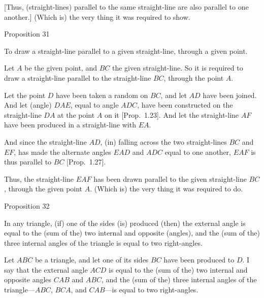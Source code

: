 \mbox{[}Thus, (straight-lines) parallel to the same straight-line are also parallel
to one another.] (Which is) the very thing it was required to show.


\begin{center}
{\large Proposition 31}
\end{center}

To draw a straight-line parallel to a given straight-line, through a given
point.

Let $A$ be the given point, and $BC$ the given straight-line. So it is
required to draw a straight-line parallel to the straight-line $BC$, through
the point $A$.

Let the point $D$ have been taken a random  on $BC$, and let $AD$ have been
joined. And let (angle) $DAE$, equal to angle $ADC$,  have been constructed 
on the straight-line $DA$ at the point $A$ on it [Prop.~1.23]. And let the
straight-line $AF$ have been
produced in a straight-line with $EA$.

\epsfysize=1.25in
\centerline{}

And since the straight-line $AD$, (in) falling across the two straight-lines
$BC$ and $EF$,  has made the alternate
angles $EAD$ and $ADC$ equal to one another, $EAF$ is thus parallel to $BC$
[Prop.~1.27].

Thus, the straight-line $EAF$ has been drawn parallel to the given straight-line $BC$, through the  given
point $A$. (Which is) the very thing it was required to do.


\begin{center}
{\large Proposition 32}
\end{center}

In any triangle,  (if) one of the sides (is) produced  (then) the external
angle is equal to the (sum of the) two internal and opposite (angles), and the (sum of the) three
internal angles of the triangle is equal to two right-angles.

\epsfysize=2in
\centerline{}

Let $ABC$ be a triangle, and let one of its sides $BC$ have been produced to $D$.
I say that the external angle $ACD$ is equal to the (sum of the) two internal and opposite
angles $CAB$ and $ABC$, and the (sum of the) three internal angles of the triangle---$ABC$, $BCA$, and $CAB$---is equal to two right-angles.

